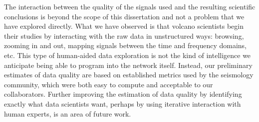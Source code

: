 The interaction between the quality of the signals used and the resulting
scientific conclusions is beyond the scope of this dissertation and not a
problem that we have explored directly. What we have observed is that volcano
scientists begin their studies by interacting with the raw data in
unstructured ways: browsing, zooming in and out, mapping signals between the
time and frequency domains, etc. This type of human-aided data exploration is
not the kind of intelligence we anticipate being able to program into the
network itself. Instead, our preliminary estimates of data quality are based
on established metrics used by the seismology community, which were both easy
to compute and acceptable to our collaborators. Further improving the
estimation of data quality by identifying exactly what data scientists want,
perhaps by using iterative interaction with human experts, is an area of
future work.

\clearpage
